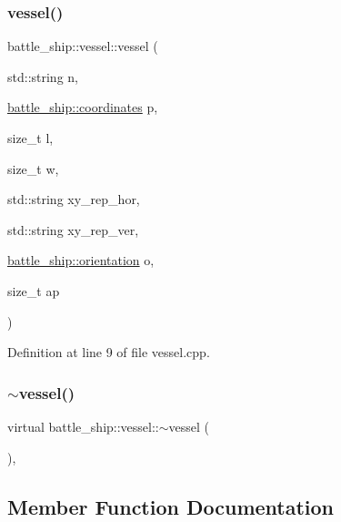 \subsubsection{\texorpdfstring{vessel()}{vessel()}\hspace{0.1cm}{\footnotesize\ttfamily [2/2]}}
{\footnotesize\ttfamily battle\+\_\+ship\+::vessel\+::vessel (\begin{DoxyParamCaption}\item[{std\+::string}]{n,  }\item[{\hyperlink{structbattle__ship_1_1coordinates}{battle\+\_\+ship\+::coordinates}}]{p,  }\item[{size\+\_\+t}]{l,  }\item[{size\+\_\+t}]{w,  }\item[{std\+::string}]{xy\+\_\+rep\+\_\+hor,  }\item[{std\+::string}]{xy\+\_\+rep\+\_\+ver,  }\item[{\hyperlink{namespacebattle__ship_aed87488f0a73f0d0679fe343fb61c784}{battle\+\_\+ship\+::orientation}}]{o,  }\item[{size\+\_\+t}]{ap }\end{DoxyParamCaption})}



Definition at line 9 of file vessel.\+cpp.

\mbox{\label{classbattle__ship_1_1vessel_a9e2c9554b6ce2af6f4e6168d1cf6591b}} 
\subsubsection{\texorpdfstring{$\sim$vessel()}{~vessel()}}
{\footnotesize\ttfamily virtual battle\+\_\+ship\+::vessel\+::$\sim$vessel (\begin{DoxyParamCaption}{ }\end{DoxyParamCaption})\hspace{0.3cm}{\ttfamily [virtual]}, {\ttfamily [default]}}



\subsection{Member Function Documentation}
\mbox{\label{classbattle__ship_1_1vessel_a9b99c5ed2629203985b25338df585234}} 
